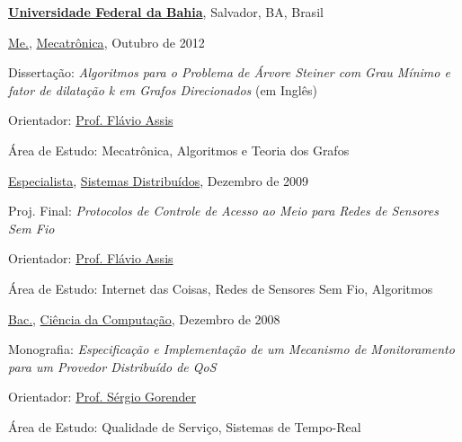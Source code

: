 \documentclass[10pt]{article}
\let\oldcite=\cite
\renewcommand{\cite}[1]{\footnotesize{\textbf{\oldcite{#1}}}\normalsize{}}
\begin{document}
\href{http://www.usp.br/}{\textbf{Universidade Federal da Bahia}},
Salvador, BA, Brasil
\begin{outerlist}

\item[] \href{https://drive.google.com/file/d/1yCOOUSEkvkE0znzI-NjAlF7pXSUlyns_/view?usp=sharing}{Me.},
        \href{http://wiki.dcc.ufba.br/Mecatronica/}
             {Mecatrônica}, Outubro de 2012 \cite{Braga2012}
        \begin{innerlist}
        \item Dissertação: \emph{Algoritmos para o Problema de Árvore Steiner com Grau Mínimo e fator de dilatação k em Grafos Direcionados} (em Inglês)
        \item Orientador:
              \href{http://wiki.dcc.ufba.br/DCC/ProfFlavioAssis}
                   {Prof. Fl\'{a}vio Assis}
        \item Área de Estudo: Mecatrônica, Algoritmos e Teoria dos Grafos
        \end{innerlist}

\item[] \href{https://drive.google.com/file/d/10p-gmuwYZkRMRWtpkc_KuEp9-Hdnl0-b/view?usp=sharing}{Especialista},
        \href{http://www.lasid.ufba.br/easd}
             {Sistemas Distribuídos}, Dezembro de 2009
        \begin{innerlist}
        \item Proj. Final: \emph{Protocolos de Controle de Acesso ao Meio para Redes de Sensores Sem Fio}
        \item Orientador:
              \href{http://wiki.dcc.ufba.br/DCC/ProfFlavioAssis}
                   {Prof. Fl\'{a}vio Assis}
        \item Área de Estudo: Internet das Coisas, Redes de Sensores Sem Fio, Algoritmos
        \end{innerlist}

\item[] \href{https://drive.google.com/file/d/1KMHie5JBf5pn6teRXKgTatzE4hq_TDZt/view?usp=sharing}{Bac.},
        \href{http://wiki.dcc.ufba.br/DCC/}
             {Ciência da Computação}, Dezembro de 2008
        \begin{innerlist}
	\item Monografia: \emph{Especificação e Implementação de um Mecanismo de Monitoramento para um Provedor Distribuído de QoS}
	\item Orientador:
              \href{http://wiki.dcc.ufba.br/DCC/ProfSergioGorender}
                   {Prof. S\'{e}rgio Gorender}
        \item Área de Estudo: Qualidade de Serviço, Sistemas de Tempo-Real
        \end{innerlist}

\end{outerlist}
\end{document}
